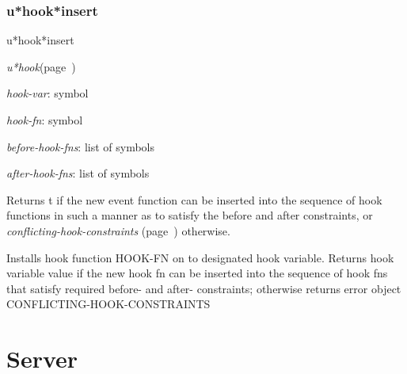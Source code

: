 \subsection{u*hook*insert}
\label{u*hook*insert}

\begin{description}
\item [Name:]  u*hook*insert

\item [Class:]
{\sl u*hook}\hfill(page~\pageref{u*hook})

\item [Parameters:]
\item {\sl hook-var}:  symbol

\item {\sl hook-fn}:  symbol

\item {\sl before-hook-fns}:  list of symbols


\item {\sl after-hook-fns}:  list of symbols



\item [Return-value:]
Returns t if the new event function can be
inserted into the sequence of hook functions in such
a manner as to satisfy the before and after 
constraints, or {\sl conflicting-hook-constraints} (page~\pageref{conflicting-hook-constraints})
otherwise.

\item [Description:]
Installs hook function HOOK-FN on to designated hook
variable.  Returns hook variable value if the new hook fn can
be inserted into the sequence of hook fns that satisfy
required before- and after- constraints; otherwise returns
error object CONFLICTING-HOOK-CONSTRAINTS


\item [Public:]



\end{description}
\horizontalline

\chapter{Server}
\label{Server}

